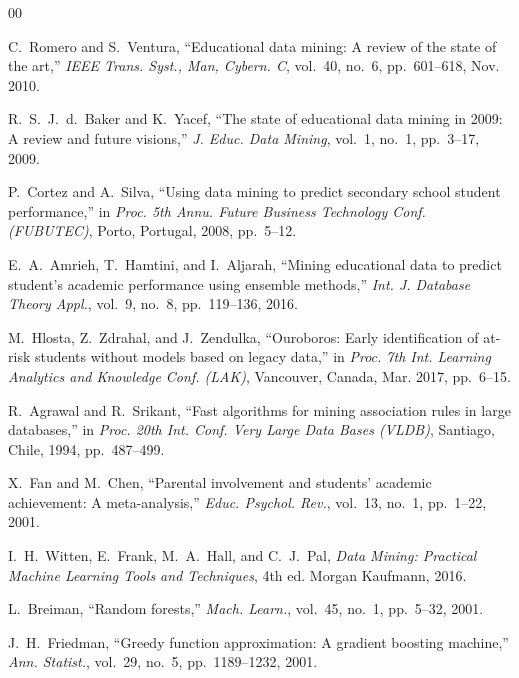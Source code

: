 \documentclass[conference]{IEEEtran}
\begin{document}
\begin{thebibliography}{00}

C.~Romero and S.~Ventura,
``Educational data mining: A review of the state of the art,''
\textit{IEEE Trans. Syst., Man, Cybern. C},
vol.~40, no.~6, pp.~601--618, Nov. 2010.

R.~S.~J.~d.~Baker and K.~Yacef,
``The state of educational data mining in 2009: A review and future visions,''
\textit{J. Educ. Data Mining},
vol.~1, no.~1, pp.~3--17, 2009.

P.~Cortez and A.~Silva,
``Using data mining to predict secondary school student performance,''
in \textit{Proc. 5th Annu. Future Business Technology Conf. (FUBUTEC)},
Porto, Portugal, 2008, pp.~5--12.

E.~A.~Amrieh, T.~Hamtini, and I.~Aljarah,
``Mining educational data to predict student's academic performance using ensemble methods,''
\textit{Int. J. Database Theory Appl.},
vol.~9, no.~8, pp.~119--136, 2016.

M.~Hlosta, Z.~Zdrahal, and J.~Zendulka,
``Ouroboros: Early identification of at-risk students without models based on legacy data,''
in \textit{Proc. 7th Int. Learning Analytics and Knowledge Conf. (LAK)},
Vancouver, Canada, Mar. 2017, pp.~6--15.

R.~Agrawal and R.~Srikant,
``Fast algorithms for mining association rules in large databases,''
in \textit{Proc. 20th Int. Conf. Very Large Data Bases (VLDB)},
Santiago, Chile, 1994, pp.~487--499.

X.~Fan and M.~Chen,
``Parental involvement and students' academic achievement: A meta-analysis,''
\textit{Educ. Psychol. Rev.},
vol.~13, no.~1, pp.~1--22, 2001.

I.~H.~Witten, E.~Frank, M.~A.~Hall, and C.~J.~Pal,
\textit{Data Mining: Practical Machine Learning Tools and Techniques},
4th ed. Morgan Kaufmann, 2016.

L.~Breiman,
``Random forests,''
\textit{Mach. Learn.},
vol.~45, no.~1, pp.~5--32, 2001.

J.~H.~Friedman,
``Greedy function approximation: A gradient boosting machine,''
\textit{Ann. Statist.},
vol.~29, no.~5, pp.~1189--1232, 2001.

\end{thebibliography}
\end{document}
